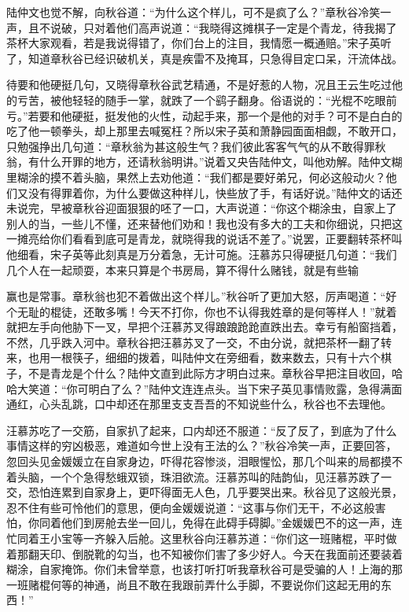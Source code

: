 \documentclass[12pt,UTF8]{ctexbook}
\begin{document}
{{{陆仲文也觉不解，向秋谷道：“为什么这个样儿，可不是疯了么？”章秋谷冷笑一声，且不说破，只对着他们高声说道：“我晓得这摊棋子一定是个青龙，待我揭了茶杯大家观看，若是我说得错了，你们台上的注目，我情愿一概通赔。”宋子英听了，知道章秋谷已经识破机关，真是疾雷不及掩耳，只急得目定口呆，汗流体战。

待要和他硬挺几句，又晓得章秋谷武艺精通，不是好惹的人物，况且王云生吃过他的亏苦，被他轻轻的随手一掌，就跌了一个鹞子翻身。俗语说的：“光棍不吃眼前亏。”若要和他硬挺，挺发他的火性，动起手来，那一个是他的对手？可不是白白的吃了他一顿拳头，却上那里去喊冤枉？所以宋子英和萧静园面面相觑，不敢开口，只勉强挣出几句道：“章秋翁为甚这般生气？我们彼此客客气气的从不敢得罪秋翁，有什么开罪的地方，还请秋翁明讲。”说着又央告陆仲文，叫他劝解。陆仲文糊里糊涂的摸不着头脑，果然上去劝他道：“我们都是要好弟兄，何必这般动火？他们又没有得罪着你，为什么要做这种样儿，快些放了手，有话好说。”陆仲文的话还未说完，早被章秋谷迎面狠狠的呸了一口，大声说道：“你这个糊涂虫，自家上了别人的当，一些儿不懂，还来替他们劝和！我也没有多大的工夫和你细说，只把这一摊亮给你们看看到底可是青龙，就晓得我的说话不差了。”说罢，正要翻转茶杯叫他细看，宋子英等此刻真是万分着急，无计可施。汪慕苏只得硬挺几句道：“我们几个人在一起顽耍，本来只算是个书房局，算不得什么赌钱，就是有些输

赢也是常事。章秋翁也犯不着做出这个样儿。”秋谷听了更加大怒，厉声喝道：“好个无耻的棍徒，还敢多嘴！今天不打你，你也不认得我姓章的是何等样人！”就着就把左手向他胁下一叉，早把个汪慕苏叉得踉踉跄跄直跌出去。幸亏有船窗挡着，不然，几乎跌入河中。章秋谷把汪慕苏叉了一交，不由分说，就把茶杯一翻了转来，也用一根筷子，细细的拨着，叫陆仲文在旁细看，数来数去，只有十六个棋子，不是青龙是个什么？陆仲文直到此际方才明白过来。章秋谷早把注目收回，哈哈大笑道：“你可明白了么？”陆仲文连连点头。当下宋子英见事情败露，急得满面通红，心头乱跳，口中却还在那里支支吾吾的不知说些什么，秋谷也不去理他。

汪慕苏吃了一交筋，自家扒了起来，口内却还不服道：“反了反了，到底为了什么事情这样的穷凶极恶，难道如今世上没有王法的么？”秋谷冷笑一声，正要回答，忽回头见金媛媛立在自家身边，吓得花容惨淡，泪眼惺忪，那几个叫来的局都摸不着头脑，一个个急得愁蛾双锁，珠泪欲流。汪慕苏叫的陆韵仙，见汪慕苏跌了一交，恐怕连累到自家身上，更吓得面无人色，几乎要哭出来。秋谷见了这般光景，忍不住有些可怜他们的意思，便向金媛媛说道：“这事与你们无干，不必这般害怕，你同着他们到房舱去坐一回儿，免得在此碍手碍脚。”金媛媛巴不的这一声，连忙同着王小宝等一齐躲入后舱。这里秋谷向汪慕苏道：“你们这一班赌棍，平时做着那翻天印、倒脱靴的勾当，也不知被你们害了多少好人。今天在我面前还要装着糊涂，自家掩饰。你们未曾举意，也该打听打听我章秋谷可是受骗的人！上海的那一班赌棍何等的神通，尚且不敢在我跟前弄什么手脚，不要说你们这起无用的东西！”

}}}
\end{document}
